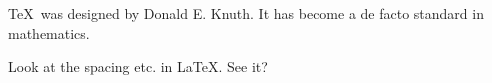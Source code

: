 \documentclass{article}
\begin{document}
\TeX\ was designed by Donald E. Knuth.
It has become a de facto standard in mathematics.

\frenchspacing Look at the spacing etc.  in LaTeX. See it?
\end{document}
